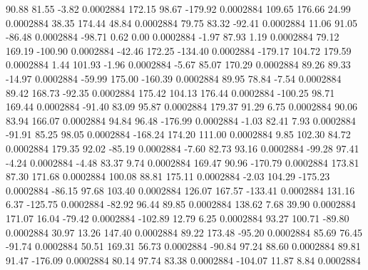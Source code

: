        90.88       81.55       -3.82     0.0002884
      172.15       98.67     -179.92     0.0002884
      109.65      176.66       24.99     0.0002884
       38.35      174.44       48.84     0.0002884
       79.75       83.32      -92.41     0.0002884
       11.06       91.05      -86.48     0.0002884
      -98.71        0.62        0.00     0.0002884
       -1.97       87.93        1.19     0.0002884
       79.12      169.19     -100.90     0.0002884
      -42.46      172.25     -134.40     0.0002884
     -179.17      104.72      179.59     0.0002884
        1.44      101.93       -1.96     0.0002884
       -5.67       85.07      170.29     0.0002884
       89.26       89.33      -14.97     0.0002884
      -59.99      175.00     -160.39     0.0002884
       89.95       78.84       -7.54     0.0002884
       89.42      168.73      -92.35     0.0002884
      175.42      104.13      176.44     0.0002884
     -100.25       98.71      169.44     0.0002884
      -91.40       83.09       95.87     0.0002884
      179.37       91.29        6.75     0.0002884
       90.06       83.94      166.07     0.0002884
       94.84       96.48     -176.99     0.0002884
       -1.03       82.41        7.93     0.0002884
      -91.91       85.25       98.05     0.0002884
     -168.24      174.20      111.00     0.0002884
        9.85      102.30       84.72     0.0002884
      179.35       92.02      -85.19     0.0002884
       -7.60       82.73       93.16     0.0002884
      -99.28       97.41       -4.24     0.0002884
       -4.48       83.37        9.74     0.0002884
      169.47       90.96     -170.79     0.0002884
      173.81       87.30      171.68     0.0002884
      100.08       88.81      175.11     0.0002884
       -2.03      104.29     -175.23     0.0002884
      -86.15       97.68      103.40     0.0002884
      126.07      167.57     -133.41     0.0002884
      131.16        6.37     -125.75     0.0002884
      -82.92       96.44       89.85     0.0002884
      138.62        7.68       39.90     0.0002884
      171.07       16.04      -79.42     0.0002884
     -102.89       12.79        6.25     0.0002884
       93.27      100.71      -89.80     0.0002884
       30.97       13.26      147.40     0.0002884
       89.22      173.48      -95.20     0.0002884
       85.69       76.45      -91.74     0.0002884
       50.51      169.31       56.73     0.0002884
      -90.84       97.24       88.60     0.0002884
       89.81       91.47     -176.09     0.0002884
       80.14       97.74       83.38     0.0002884
     -104.07       11.87        8.84     0.0002884
